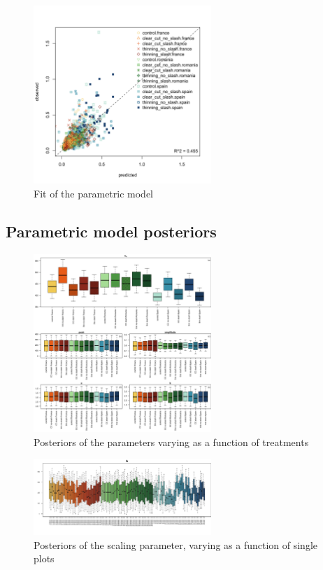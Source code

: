 \documentclass[
]{article}
\begin{document}
\begin{figure}
\centering
\includegraphics[width=0.6\textwidth,height=\textheight]{../Figures/fit_model_validation.png}
\caption{Fit of the parametric model}
\end{figure}

\subsection{Parametric model posteriors}\label{parametric-model-posteriors}

\begin{figure}
\centering
\includegraphics[width=0.6\textwidth,height=\textheight]{../Figures/posteriors_boxplots.png}
\caption{Posteriors of the parameters varying as a function of treatments}
\end{figure}

\begin{figure}
\centering
\includegraphics[width=0.6\textwidth,height=\textheight]{../Figures/posteriors_boxplots_A.png}
\caption{Posteriors of the scaling parameter, varying as a function of single plots}
\end{figure}
\end{document}
